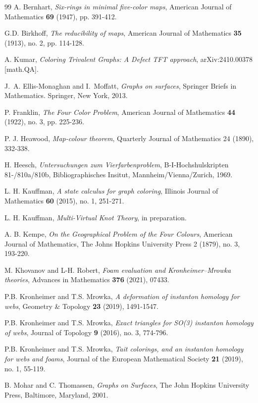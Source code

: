 \documentclass[12pt]{amsart}
\theoremstyle{definition}
\theoremstyle{remark}
\numberwithin{equation}{section}
\begin{document}
\begin{thebibliography}{99}
 A. Bernhart, {\em Six-rings in minimal five-color maps}, American Journal of Mathematics {\bf 69} (1947), pp. 391-412.

 G.D. Birkhoff, {\em The reducibility of maps}, American Journal of Mathematics {\bf 35} (1913), no. 2, pp. 114-128.

 A. Kumar, {\em Coloring Trivalent Graphs: A Defect TFT approach}, 	arXiv:2410.00378 [math.QA].

 J.~A. Ellis-Monaghan and I.~Moffatt, {\em Graphs on surfaces}, Springer Briefs in Mathematics. Springer, New York, 2013.

 P. Franklin, {\em The Four Color Problem}, American Journal of Mathematics {\bf 44} (1922), no. 3, pp. 225-236.

 P. J. Heawood, \emph{Map-colour theorem}, Quarterly Journal of Mathematics 24 (1890), 332-338.

 H. Heesch, {\em Untersuchungen zum Vierfarbenproblem}, B-I-Hochshulskripten 81-/810a/810b, Bibliographisches Insitut, Mannheim/Vienna/Zurich, 1969.

 L. H. Kauffman, {\em A state calculus for graph coloring}, Illinois Journal of Mathematics {\bf 60} (2015), no. 1, 251-271.

  L. H. Kauffman, {\em Multi-Virtual Knot Theory}, in preparation.

 A. B. Kempe, {\em On the Geographical Problem of the Four Colours}, American Journal of Mathematics, The Johns
Hopkins University Press 2 (1879), no. 3, 193-220.

 M. Khovanov and L-H. Robert, {\em Foam evaluation and Kronheimer--Mrowka theories}, Advances in Mathematics {\bf 376} (2021), 07433.

 P.B. Kronheimer and T.S. Mrowka, {\em A deformation of instanton homology for webs}, Geometry \& Topology {\bf 23} (2019), 1491-1547.

 P.B. Kronheimer and T.S. Mrowka, {\em Exact triangles for SO(3) instanton homology of webs}, Journal of Topology {\bf 9} (2016), no. 3, 774-796.

 P.B. Kronheimer and T.S. Mrowka, {\em Tait colorings, and an instanton homology for webs and foams}, Journal of the European Mathematical Society {\bf 21} (2019), no. 1, 55-119.

 B. Mohar and C. Thomassen, {\em Graphs on Surfaces}, The John Hopkins University Press, Baltimore, Maryland, 2001.


\end{thebibliography}
\end{document}
